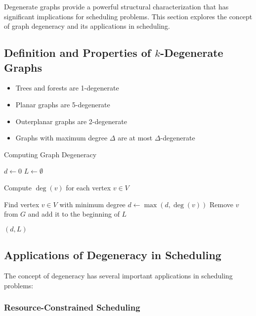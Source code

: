 \documentclass{article}
\theoremstyle{definition}
\begin{document}
Degenerate graphs provide a powerful structural characterization that has significant implications for scheduling problems. This section explores the concept of graph degeneracy and its applications in scheduling.

\subsection*{Definition and Properties of $k$-Degenerate Graphs}

\begin{itemize}
    \item Trees and forests are 1-degenerate
    \item Planar graphs are 5-degenerate
    \item Outerplanar graphs are 2-degenerate
    \item Graphs with maximum degree $\Delta$ are at most $\Delta$-degenerate
\end{itemize}

\begin{algorithm}
\caption{Computing Graph Degeneracy}
\label{alg:compute-degeneracy}
\begin{algorithmic}[1]
        \State $d \gets 0$ 
        \State $L \gets \emptyset$ 
        
        \State Compute $\deg(v)$ for each vertex $v \in V$
        
            \State Find vertex $v \in V$ with minimum degree
            \State $d \gets \max(d, \deg(v))$ 
            \State Remove $v$ from $G$ and add it to the beginning of $L$
        \EndWhile
        
        \State \Return $(d, L)$ 
    \EndProcedure
\end{algorithmic}
\end{algorithm}


\subsection*{Applications of Degeneracy in Scheduling}

The concept of degeneracy has several important applications in scheduling problems:

\subsubsection*{Resource-Constrained Scheduling}
\end{document}
